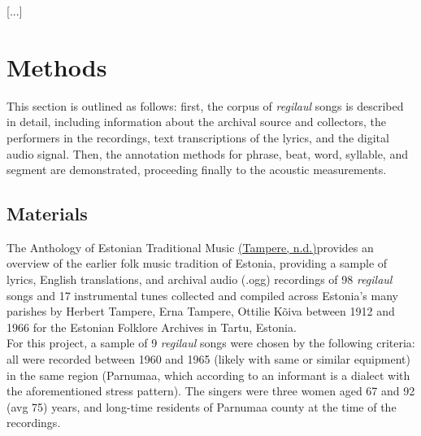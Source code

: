 \documentclass[11pt]{article}
\begin{document}
[...]
\section*{Methods}
This section is outlined as follows: first, the corpus of {\it regilaul} songs is described in detail, including information about the archival source and collectors, the performers in the recordings, text transcriptions of the lyrics, and the digital audio signal. Then, the annotation methods for phrase, beat, word, syllable, and segment are demonstrated, proceeding finally to the acoustic measurements.

\subsection*{Materials}









The Anthology of Estonian Traditional Music \hyperref[csl:1]{(Tampere, n.d.)}provides an overview of the earlier folk music tradition of Estonia, providing a sample of lyrics, English translations, and archival audio (.ogg) recordings of 98 {\it regilaul} songs and 17 instrumental tunes collected and compiled across Estonia's many parishes by Herbert Tampere, Erna Tampere, Ottilie Kõiva between 1912 and 1966 for the Estonian Folklore Archives in Tartu, Estonia. \\

For this project, a sample of 9 {\it regilaul} songs were chosen by the following criteria: all were recorded between 1960 and 1965 (likely with same or similar equipment) in the same region (Parnumaa, which according to an informant is a dialect with the aforementioned stress pattern). The singers were three women aged 67 and 92 (avg 75) years, and long-time residents of Parnumaa county at the time of the recordings. 

\end{document}
